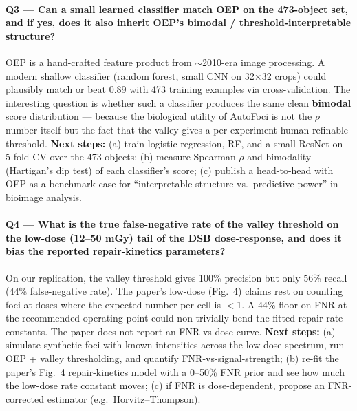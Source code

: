 \documentclass[11pt]{article}
\begin{document}
\paragraph{Q3 --- Can a small learned classifier match OEP on the 473-object set, and if yes, does it also inherit OEP's bimodal / threshold-interpretable structure?} OEP is a hand-crafted feature product from $\sim$2010-era image processing. A modern shallow classifier (random forest, small CNN on 32$\times$32 crops) could plausibly match or beat 0.89 with 473 training examples via cross-validation. The interesting question is whether such a classifier produces the same clean \textbf{bimodal} score distribution --- because the biological utility of AutoFoci is not the $\rho$ number itself but the fact that the valley gives a per-experiment human-refinable threshold. \textbf{Next steps:} (a) train logistic regression, RF, and a small ResNet on 5-fold CV over the 473 objects; (b) measure Spearman $\rho$ and bimodality (Hartigan's dip test) of each classifier's score; (c) publish a head-to-head with OEP as a benchmark case for ``interpretable structure vs.\ predictive power'' in bioimage analysis.

\paragraph{Q4 --- What is the true false-negative rate of the valley threshold on the low-dose (12--50 mGy) tail of the DSB dose-response, and does it bias the reported repair-kinetics parameters?} On our replication, the valley threshold gives 100\% precision but only 56\% recall (44\% false-negative rate). The paper's low-dose (Fig.~4) claims rest on counting foci at doses where the expected number per cell is $<$1. A 44\% floor on FNR at the recommended operating point could non-trivially bend the fitted repair rate constants. The paper does not report an FNR-vs-dose curve. \textbf{Next steps:} (a) simulate synthetic foci with known intensities across the low-dose spectrum, run OEP + valley thresholding, and quantify FNR-vs-signal-strength; (b) re-fit the paper's Fig.~4 repair-kinetics model with a 0--50\% FNR prior and see how much the low-dose rate constant moves; (c) if FNR is dose-dependent, propose an FNR-corrected estimator (e.g.\ Horvitz--Thompson).
\end{document}
